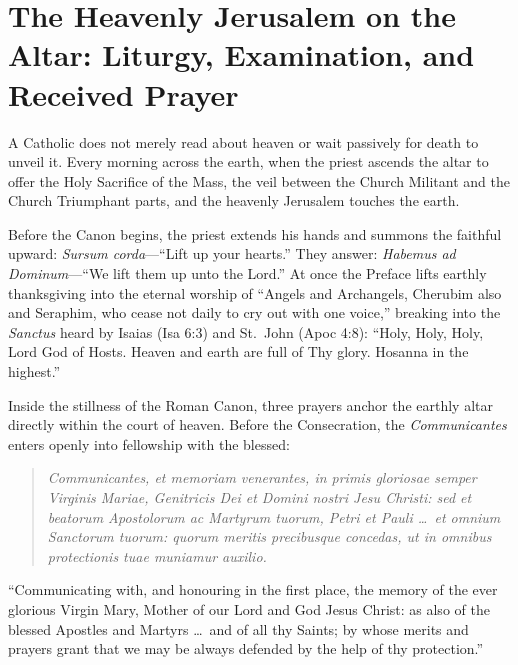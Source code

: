 \section{The Heavenly Jerusalem on the Altar: Liturgy, Examination, and Received Prayer}

A Catholic does not merely read about heaven or wait passively for death to unveil it. Every morning across the earth, when the priest ascends the altar to offer the Holy Sacrifice of the Mass, the veil between the Church Militant and the Church Triumphant parts, and the heavenly Jerusalem touches the earth.

Before the Canon begins, the priest extends his hands and summons the faithful upward: \textit{Sursum corda}---``Lift up your hearts.'' They answer: \textit{Habemus ad Dominum}---``We lift them up unto the Lord.'' At once the Preface lifts earthly thanksgiving into the eternal worship of ``Angels and Archangels, Cherubim also and Seraphim, who cease not daily to cry out with one voice,'' breaking into the \textit{Sanctus} heard by Isaias (Isa 6:3) and St.\ John (Apoc 4:8): ``Holy, Holy, Holy, Lord God of Hosts. Heaven and earth are full of Thy glory. Hosanna in the highest.''

Inside the stillness of the Roman Canon, three prayers anchor the earthly altar directly within the court of heaven. Before the Consecration, the \textit{Communicantes} enters openly into fellowship with the blessed:

\begin{quote}
\textit{Communicantes, et memoriam venerantes, in primis gloriosae semper Virginis Mariae, Genitricis Dei et Domini nostri Jesu Christi: sed et beatorum Apostolorum ac Martyrum tuorum, Petri et Pauli \dots\ et omnium Sanctorum tuorum: quorum meritis precibusque concedas, ut in omnibus protectionis tuae muniamur auxilio.}
\end{quote}

``Communicating with, and honouring in the first place, the memory of the ever glorious Virgin Mary, Mother of our Lord and God Jesus Christ: as also of the blessed Apostles and Martyrs \dots\ and of all thy Saints; by whose merits and prayers grant that we may be always defended by the help of thy protection.''

